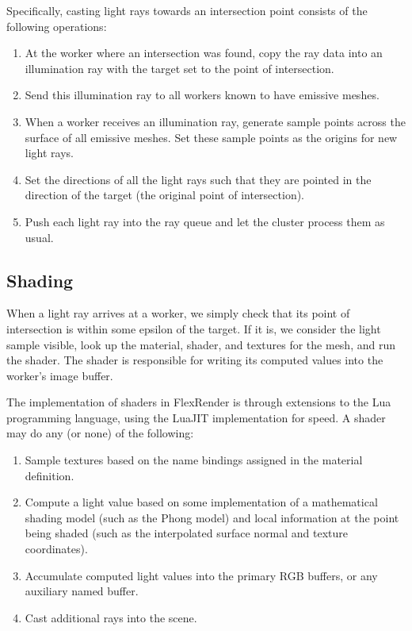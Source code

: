 \documentclass[12pt]{ucthesis}
\begin{document}
Specifically, casting light rays towards an intersection point consists of the
following operations:

\begin{enumerate}
    \item At the worker where an intersection was found, copy the ray data into
        an illumination ray with the target set to the point of intersection.
    \item Send this illumination ray to all workers known to have emissive meshes.
    \item When a worker receives an illumination ray, generate sample points
        across the surface of all emissive meshes. Set these sample points as
        the origins for new light rays.
    \item Set the directions of all the light rays such that they are pointed
        in the direction of the target (the original point of intersection).
    \item Push each light ray into the ray queue and let the cluster process
        them as usual.
\end{enumerate}

\subsection{Shading}
\label{shading}

When a light ray arrives at a worker, we simply check that its point of
intersection is within some epsilon of the target. If it is, we consider the
light sample visible, look up the material, shader, and textures for the mesh,
and run the shader. The shader is responsible for writing its computed values
into the worker's image buffer.

The implementation of shaders in FlexRender is through extensions to the Lua
\cite{lua} programming language, using the LuaJIT \cite{luajit} implementation
for speed. A shader may do any (or none) of the following:

\begin{enumerate}
    \item Sample textures based on the name bindings assigned in the material
        definition.
    \item Compute a light value based on some implementation of a mathematical
        shading model (such as the Phong model) and local information at the
        point being shaded (such as the interpolated surface normal and texture
        coordinates).
    \item Accumulate computed light values into the primary RGB buffers, or
        any auxiliary named buffer.
    \item Cast additional rays into the scene.
\end{enumerate}
\end{document}
